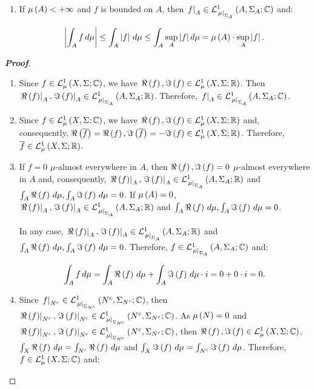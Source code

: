 \begin{proposition}
\begin{enumerate}
    \begin{equation}
      \bars{\int_{X}{f\,d\mu}}\leq\int_{X}{\bars{f}\,d\mu}.
    \end{equation}
    \item If $\mu\pr{A}<+\infty$ and $f$ is bounded on $A$, then $\rest{f}{A}\in\LebC{A}{\Sigma_A}{\rest{\mu}{\Sigma_A}}$ and:
    
    \begin{equation}
      \bars{\int_{A}{f\,d\mu}}\leq\int_{A}{\bars{f}\,d\mu}\leq\int_{A}{\sup_A{\bars{f}}\,d\mu}=\mu\pr{A}\cdot\sup_A\bars{f}.
    \end{equation}
  \end{enumerate}
  \begin{proof}[\rm\textbf{Proof}]
    \hfill
    \begin{enumerate}
      \item Since $f\in\LebC{X}{\Sigma}{\mu}$, we have $\Re\pr{f},\Im\pr{f}\in\LebR{X}{\Sigma}{\mu}$. Then $\rest{\Re\pr{f}}{A},\rest{\Im\pr{f}}{A}\in\LebR{A}{\Sigma_A}{\rest{\mu}{\Sigma_A}}$. Therefore, $\rest{f}{A}\in\LebC{A}{\Sigma_A}{\rest{\mu}{\Sigma_A}}$.
      \item Since $f\in\LebC{X}{\Sigma}{\mu}$, we have $\Re\pr{f},\Im\pr{f}\in\LebR{X}{\Sigma}{\mu}$ and, consequently, $\Re\pr{\overline{f}}=\Re\pr{f},\Im\pr{\overline{f}}=-\Im\pr{f}\in\LebR{X}{\Sigma}{\mu}$. Therefore, $\overline{f}\in\LebR{X}{\Sigma}{\mu}$.
      \item If $f=0$ $\mu$-almost everywhere in $A$, then $\Re\pr{f},\Im\pr{f}=0$ $\mu$-almost everywhere in $A$ and, consequently, $\rest{\Re\pr{f}}{A},\rest{\Im\pr{f}}{A}\in\LebR{A}{\Sigma_A}{\rest{\mu}{\Sigma_A}}$ and $\int_{A}{\Re\pr{f}\,d\mu},\int_{A}{\Im\pr{f}\,d\mu}=0$. If $\mu\pr{A}=0$, $\rest{\Re\pr{f}}{A},\rest{\Im\pr{f}}{A}\in\LebR{A}{\Sigma_A}{\rest{\mu}{\Sigma_A}}$ and $\int_{A}{\Re\pr{f}\,d\mu},\int_{A}{\Im\pr{f}\,d\mu}=0$.

      In any case, $\rest{\Re\pr{f}}{A},\rest{\Im\pr{f}}{A}\in\LebR{A}{\Sigma_A}{\rest{\mu}{\Sigma_A}}$ and $\int_{A}{\Re\pr{f}\,d\mu},\int_{A}{\Im\pr{f}\,d\mu}=0$. Therefore, $f\in\LebC{A}{\Sigma_A}{\rest{\mu}{\Sigma_A}}$ and:

      \begin{equation}
        \int_{A}{f\,d\mu}=\int_{A}{\Re\pr{f}\,d\mu}+\int_{A}{\Im\pr{f}\,d\mu}\cdot i=0+0\cdot i=0.
      \end{equation}
      \item Since $\rest{f}{N^c}\in\LebC{N^c}{\Sigma_{N^c}}{\rest{\mu}{\Sigma_{N^c}}}$, then $\rest{\Re\pr{f}}{N^c},\rest{\Im\pr{f}}{N^c}\in\LebC{N^c}{\Sigma_{N^c}}{\rest{\mu}{\Sigma_{N^c}}}$. As $\mu\pr{N}=0$ and $\rest{\Re\pr{f}}{N^c},\rest{\Im\pr{f}}{N^c}\in\LebC{N^c}{\Sigma_{N^c}}{\rest{\mu}{\Sigma_{N^c}}}$, then $\Re\pr{f},\Im\pr{f}\in\LebC{X}{\Sigma}{\mu}$, $\int_{X}{\Re\pr{f}\,d\mu}=\int_{N^c}{\Re\pr{f}\,d\mu}$ and $\int_{X}{\Im\pr{f}\,d\mu}=\int_{N^c}{\Im\pr{f}\,d\mu}$. Therefore, $f\in\LebC{X}{\Sigma}{\mu}$ and:
      

\end{enumerate}
\end{proof}
\end{proposition}
